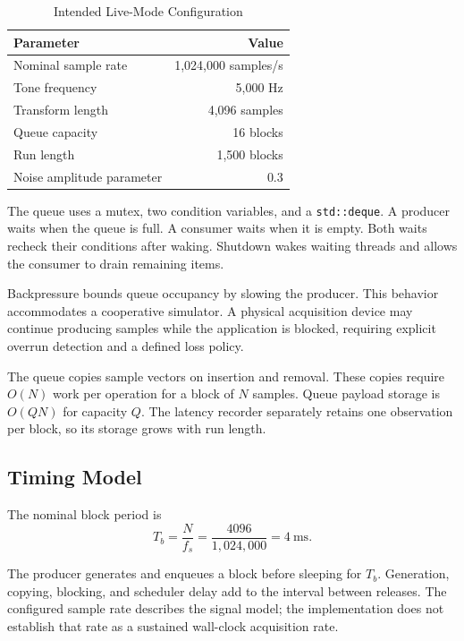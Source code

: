 \documentclass[conference]{IEEEtran}
\begin{document}
\begin{table}[t]
\caption{Intended Live-Mode Configuration}
\label{tab:config}
\centering
\begin{tabular}{@{}lr@{}}
\toprule
Parameter & Value \\
\midrule
Nominal sample rate & 1,024,000 samples/s \\
Tone frequency & 5,000 Hz \\
Transform length & 4,096 samples \\
Queue capacity & 16 blocks \\
Run length & 1,500 blocks \\
Noise amplitude parameter & 0.3 \\
\bottomrule
\end{tabular}
\end{table}

The queue uses a mutex, two condition variables, and a
\texttt{std::deque}. A producer waits when the queue is full.
A consumer waits when it is empty. Both waits recheck their
conditions after waking. Shutdown wakes waiting threads
and allows the consumer to drain remaining items.

Backpressure bounds queue occupancy by slowing the producer.
This behavior accommodates a cooperative simulator.
A physical acquisition device may continue producing samples
while the application is blocked, requiring explicit overrun
detection and a defined loss policy.

The queue copies sample vectors on insertion and removal.
These copies require \(O(N)\) work per operation for a block
of \(N\) samples. Queue payload storage is \(O(QN)\) for
capacity \(Q\). The latency recorder separately retains
one observation per block, so its storage grows with run
length.

\subsection{Timing Model}

The nominal block period is
\begin{equation}
T_b=\frac{N}{f_s}
=\frac{4096}{1{,}024{,}000}
=4\ \mathrm{ms}.
\end{equation}

The producer generates and enqueues a block before sleeping
for \(T_b\). Generation, copying, blocking, and scheduler
delay add to the interval between releases. The configured
sample rate describes the signal model; the implementation
does not establish that rate as a sustained wall-clock
acquisition rate.
\end{document}
